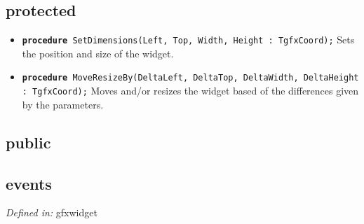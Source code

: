\documentclass{book}
\begin{document}
\subsection[protected]{protected}
\begin{itemize}
    \item	\texttt{\textbf{procedure} SetDimensions(Left, Top, Width, Height : TgfxCoord);} 
		\newline Sets the position and size of the widget.
    \item 	\texttt{\textbf{procedure} MoveResizeBy(DeltaLeft, DeltaTop, DeltaWidth, DeltaHeight : TgfxCoord);} 
		\newline Moves and/or resizes the widget based of the differences given by the parameters.
\end{itemize}
\subsection[public]{public}
\subsection[events]{events}
\textit{Defined in:} gfxwidget
\end{document}
